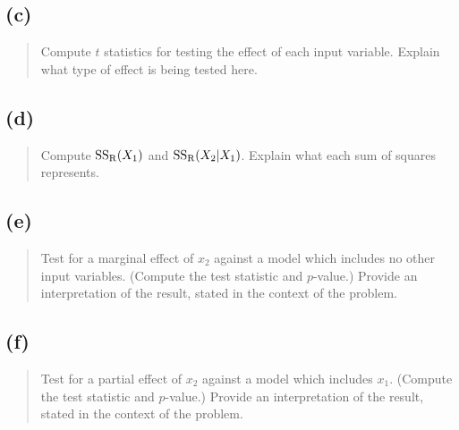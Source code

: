 \documentclass[
]{article}
\begin{document}
\vspace{50pt}

\hypertarget{c}{%
\subsection{(c)}\label{c}}

\begin{quote}
Compute \(t\) statistics for testing the effect of each input variable.
Explain what type of effect is being tested here.
\end{quote}

\vspace{50pt}

\hypertarget{d}{%
\subsection{(d)}\label{d}}

\begin{quote}
Compute \(\mathrm{SS_{R}}(X_1)\) and \(\mathrm{SS_{R}}(X_2|X_1)\). Explain what each sum
of squares represents.
\end{quote}

\vspace{50pt}

\hypertarget{e}{%
\subsection{(e)}\label{e}}

\begin{quote}
Test for a marginal effect of \(x_2\) against a model which includes no
other input variables. (Compute the test statistic and \(p\)-value.)
Provide an interpretation of the result, stated in the context of the
problem.
\end{quote}

\vspace{50pt}

\hypertarget{f}{%
\subsection{(f)}\label{f}}

\begin{quote}
Test for a partial effect of \(x_2\) against a model which includes
\(x_1\). (Compute the test statistic and \(p\)-value.) Provide an
interpretation of the result, stated in the context of the problem.
\end{quote}

\vspace{50pt}
\end{document}
